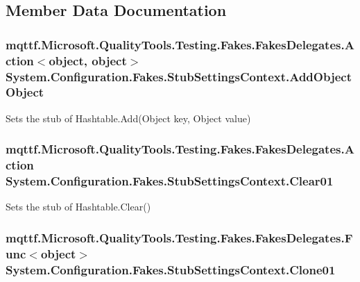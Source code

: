 \subsection{Member Data Documentation}
\hypertarget{class_system_1_1_configuration_1_1_fakes_1_1_stub_settings_context_ad3f6284ab214562327134b7b78976344}{
\subsubsection[{Add\-Object\-Object}]{\setlength{\rightskip}{0pt plus 5cm}mqttf.\-Microsoft.\-Quality\-Tools.\-Testing.\-Fakes.\-Fakes\-Delegates.\-Action$<$object, object$>$ System.\-Configuration.\-Fakes.\-Stub\-Settings\-Context.\-Add\-Object\-Object}}\label{class_system_1_1_configuration_1_1_fakes_1_1_stub_settings_context_ad3f6284ab214562327134b7b78976344}


Sets the stub of Hashtable.\-Add(\-Object key, Object value)

\hypertarget{class_system_1_1_configuration_1_1_fakes_1_1_stub_settings_context_a11656d4c5c61d1420912bef61ee0f9b6}{
\subsubsection[{Clear01}]{\setlength{\rightskip}{0pt plus 5cm}mqttf.\-Microsoft.\-Quality\-Tools.\-Testing.\-Fakes.\-Fakes\-Delegates.\-Action System.\-Configuration.\-Fakes.\-Stub\-Settings\-Context.\-Clear01}}\label{class_system_1_1_configuration_1_1_fakes_1_1_stub_settings_context_a11656d4c5c61d1420912bef61ee0f9b6}


Sets the stub of Hashtable.\-Clear()

\hypertarget{class_system_1_1_configuration_1_1_fakes_1_1_stub_settings_context_ae76fefeca9c37aba7f0633585758e6ad}{
\subsubsection[{Clone01}]{\setlength{\rightskip}{0pt plus 5cm}mqttf.\-Microsoft.\-Quality\-Tools.\-Testing.\-Fakes.\-Fakes\-Delegates.\-Func$<$object$>$ System.\-Configuration.\-Fakes.\-Stub\-Settings\-Context.\-Clone01}}\label{class_system_1_1_configuration_1_1_fakes_1_1_stub_settings_context_ae76fefeca9c37aba7f0633585758e6ad}


